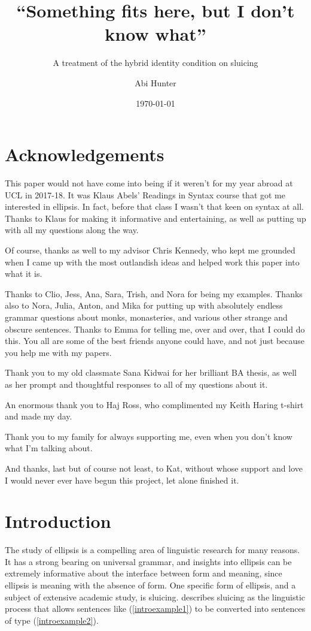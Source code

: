 \documentclass{turabian-researchpaper}
\title{``Something fits here, but I don't know what''}
\subtitle{A treatment of the hybrid identity condition on sluicing}
\author{Abi Hunter}
\date{\today}
\begin{document}
\maketitle

\section*{Acknowledgements}
This paper would not have come into being if it weren't for my year abroad at UCL in 2017-18. It was Klaus Abels' Readings in Syntax course that got me interested in ellipsis. In fact, before that class I wasn't that keen on syntax at all. Thanks to Klaus for making it informative and entertaining, as well as putting up with all my questions along the way. 

Of course, thanks as well to my advisor Chris Kennedy, who kept me grounded when I came up with the most outlandish ideas and helped work this paper into what it is. 

Thanks to Clio, Jess, Ana, Sara, Trish, and Nora for being my examples. Thanks also to Nora, Julia, Anton, and Mika for putting up with absolutely endless grammar questions about monks, monasteries, and various other strange and obscure sentences. Thanks to Emma for telling me, over and over, that I could do this. You all are some of the best friends anyone could have, and not just because you help me with my papers. 

Thank you to my old classmate Sana Kidwai for her brilliant BA thesis, as well as her prompt and thoughtful responses to all of my questions about it.

An enormous thank you to Haj Ross, who complimented my Keith Haring t-shirt and made my day. 

Thank you to my family for always supporting me, even when you don't know what I'm talking about. 

And thanks, last but of course not least, to Kat, without whose support and love I would never ever have begun this project, let alone finished it.

\clearpage

\section{Introduction}

The study of ellipsis is a compelling area of linguistic research for many reasons. It has a strong bearing on universal grammar, and insights into ellipsis can be extremely informative about the interface between form and meaning, since ellipsis is meaning with the absence of form. One specific form of ellipsis, and a subject of extensive academic study, is sluicing. \citet{rossguesswho} describes sluicing as the linguistic process that allows sentences like (\ref{introexample1}) to be converted into sentences of type (\ref{introexample2}). 
\end{document}
